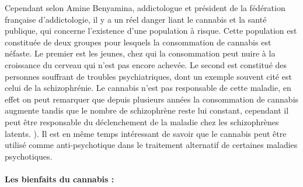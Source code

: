    
Cependant selon Amine Benyamina, addictologue et président de la fédération française d’addictologie, il y a un réel danger liant le cannabis et la santé publique, qui concerne l’existence d’une population à risque. Cette population est constituée de deux groupes pour lesquels la consommation de cannabis est néfaste. Le premier est les jeunes, chez qui la  consommation peut nuire à la croissance du cerveau qui n’est pas encore achevée. Le second est constitué des personnes souffrant de troubles psychiatriques, dont un exemple souvent cité est celui de la schizophrénie. Le cannabis n’est pas responsable de cette maladie, en effet on peut remarquer que depuis plusieurs années la consommation de cannabis augmente tandis que le nombre de schizophrène reste lui constant, cependant il peut être responsable du déclenchement de la maladie chez les schizophrènes latents. \cite{franceCulture}).  Il est en même temps intéressant de savoir que le cannabis peut être utilisé comme anti-psychotique dans le traitement alternatif de certaines maladies psychotiques.   

\paragraph{Les bienfaits du cannabis :}

